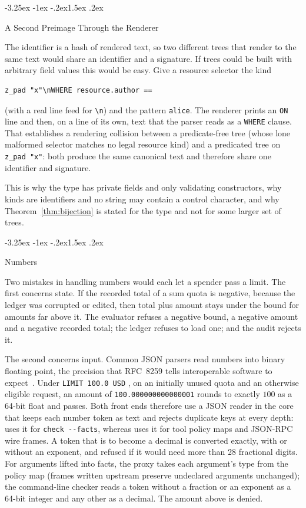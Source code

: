 \documentclass[10pt,twocolumn]{article}
\makeatletter
\theoremstyle{plain}
\theoremstyle{definition}
\renewcommand\subsection{\@startsection{subsection}{2}{\z@}%
  {-3.25ex \@plus -1ex \@minus -.2ex}{1.5ex \@plus .2ex}%
  {\normalfont\large\bfseries\raggedright}}
\makeatother
\begin{document}
\subsection{A Second Preimage Through the Renderer}
\label{sec:attack-preimage}

The identifier is a hash of rendered text, so two different trees that render to the same text would share an identifier and a signature. If trees could be built with arbitrary field values this would be easy. Give a resource selector the kind
\begin{lstlisting}
z_pad "x"\nWHERE resource.author ==
\end{lstlisting}
(with a real line feed for \texttt{\textbackslash n}) and the pattern \texttt{alice}. The renderer prints an \texttt{ON} line and then, on a line of its own, text that the parser reads as a \texttt{WHERE} clause. That establishes a rendering collision between a predicate-free tree (whose lone malformed selector matches no legal resource kind) and a predicated tree on \texttt{z\_pad "x"}: both produce the same canonical text and therefore share one identifier and signature.

This is why the type has private fields and only validating constructors, why kinds are identifiers and no string may contain a control character, and why Theorem~\ref{thm:bijection} is stated for the type and not for some larger set of trees.

\subsection{Numbers}
\label{sec:attack-numeric}

Two mistakes in handling numbers would each let a spender pass a limit. The first concerns state. If the recorded total of a sum quota is negative, because the ledger was corrupted or edited, then total plus amount stays under the bound for amounts far above it. The evaluator refuses a negative bound, a negative amount and a negative recorded total; the ledger refuses to load one; and the audit rejects it.

The second concerns input. Common JSON parsers read numbers into binary floating point, the precision that RFC~8259 tells interoperable software to expect~\cite{rfc8259}. Under \texttt{LIMIT 100.0 USD} , on an initially unused quota and an otherwise eligible request, an amount of \texttt{100.000000000000001} rounds to exactly $100$ as a 64-bit float and passes. Both front ends therefore use a JSON reader in the core that keeps each number token as text and rejects duplicate keys at every depth:  uses it for \texttt{check {-}{-}facts}, whereas  uses it for tool policy maps and JSON-RPC wire frames. A token that is to become a decimal is converted exactly, with or without an exponent, and refused if it would need more than 28 fractional digits. For arguments lifted into facts, the proxy takes each argument's type from the policy map (frames written upstream preserve undeclared arguments unchanged); the command-line checker reads a token without a fraction or an exponent as a 64-bit integer and any other as a decimal. The amount above is denied.
\end{document}
